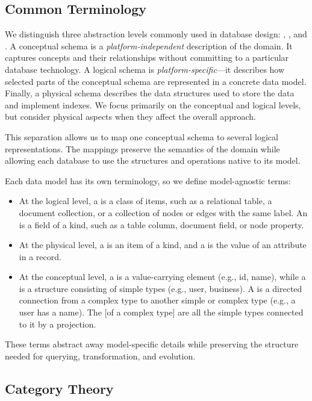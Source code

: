 \subsection{Common Terminology}

We distinguish three abstraction levels commonly used in database design: , , and . A conceptual schema is a \emph{platform-independent} description of the domain. It captures concepts and their relationships without committing to a particular database technology. A logical schema is \emph{platform-specific}---it describes how selected parts of the conceptual schema are represented in a concrete data model. Finally, a physical schema describes the data structures used to store the data and implement indexes. We focus primarily on the conceptual and logical levels, but consider physical aspects when they affect the overall approach.

This separation allows us to map one conceptual schema to several logical representations. The mappings preserve the semantics of the domain while allowing each database to use the structures and operations native to its model.

Each data model has its own terminology, so we define model-agnostic terms:
\begin{itemize}
    \item At the logical level, a  is a class of items, such as a relational table, a document collection, or a collection of nodes or edges with the same label. An  is a field of a kind, such as a table column, document field, or node property.
    \item At the physical level, a  is an item of a kind, and a  is the value of an attribute in a record.
    \item At the conceptual level, a  is a value-carrying element (e.g., id, name), while a  is a structure consisting of simple types (e.g., user, business). A  is a directed connection from a complex type to another simple or complex type (e.g., a user has a name). The  {[}of a complex type{]} are all the simple types connected to it by a projection.
\end{itemize}
These terms abstract away model-specific details while preserving the structure needed for querying, transformation, and evolution.

\subsection{Category Theory}

